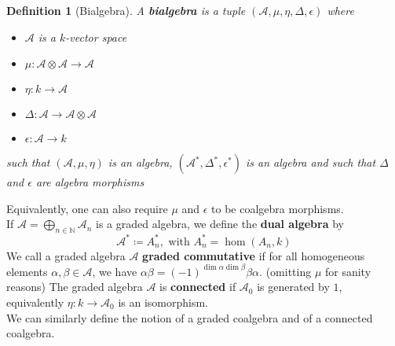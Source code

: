 \documentclass[11pt, a4paper]{article}
\newtheorem{defn}{Definition}
\theoremstyle{plain}
\begin{document}
\begin{defn}[Bialgebra]
	A \textbf{bialgebra} is a tuple $( \mathcal{A}, \mu, \eta, \Delta, \epsilon) $ where
	\begin{itemize}
	\item $\mathcal{A}$ is a $k$-vector space
	\item $\mu\colon \mathcal{A}\otimes \mathcal{A}\to \mathcal{A}$ 
	\item $\eta\colon k \to \mathcal{A}$ 
	\item $\Delta\colon \mathcal{A}\to \mathcal{A}\otimes \mathcal{A}$ 
	\item $\epsilon\colon \mathcal{A}\to k$ 
	\end{itemize}
	
	such that $( \mathcal{A}, \mu,\eta)$ is an algebra, $( \mathcal{A}^{\ast}, \Delta^{\ast}, \epsilon^{\ast}) $ is an algebra and such that $\Delta$ and $\epsilon$ are algebra morphisms
\end{defn}
Equivalently, one can also require $\mu$ and $\epsilon$ to be coalgebra morphisms.\\
If $\mathcal{A}= \bigoplus_{n \in \mathbb{N}}  \mathcal{A}_n$ is a graded algebra, we define the \textbf{dual algebra} by
\[ 
\mathcal{A}^{\ast} \coloneq A_n^{\ast}, \text{ with } A_n^{\ast}=\hom( A_{n} , k) 
\]
We call a graded algebra $\mathcal{A}$ \textbf{graded commutative} if for all homogeneous elements $\alpha,\beta \in \mathcal{A}$, we have $\alpha \beta= (-1)^{\dim \alpha\dim\beta}\beta \alpha$. (omitting $\mu$ for sanity reasons)
The graded algebra $\mathcal{A}$ is \textbf{connected} if $\mathcal{A}_0$ is generated by $1$, equivalently $\eta\colon k \to \mathcal{A}_0$ is an isomorphism.\\
We can similarly define the notion of a  graded coalgebra and of a connected coalgebra.
\end{document}
